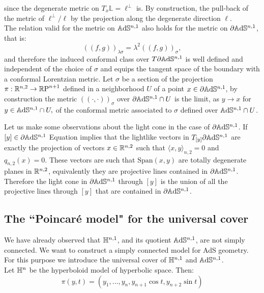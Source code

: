 since the degenerate metric on $T_x\mathbb{L}=\ell^\perp$ is. By construction, the pull-back of the metric of $\ell^{\perp}/\ell$ by the projection along the degenerate direction $\ell$.\\ 
The relation valid for the metric on $\mathbb{A}\mathrm{d}\mathbb{S}^{n,1}$ also holds for the metric on $\partial\mathbb{A}\mathrm{d}\mathbb{S}^{n,1}$, that is: 
\begin{equation}\label{26}
    ((f,g))_{\lambda\sigma}=\lambda^2((f,g))_{\sigma},
\end{equation} 
and therefore the induced conformal class over $T\partial\mathbb{A}\mathrm{d}\mathbb{S}^{n,1}$ is well defined and independent of the choice of $\sigma$ and equips the tangent space of the boundary with a conformal Lorentzian metric. %
Let $\sigma$ be a section of the projection $\pi:\mathbb{R}^{n,2}\to \mathbb{R}\text{P}^{n+1}$ defined in a neighborhood $U$ of a point $x\in\partial\mathbb{A}\mathrm{d}\mathbb{S}^{n,1}$, by construction the metric $((\cdot,\cdot))_\sigma$ over $\partial\mathbb{A}\mathrm{d}\mathbb{S}^{n,1}\cap U$ is the limit, as $y\to x$ for $y\in\mathbb{A}\mathrm{d}\mathbb{S}^{n,1}\cap U,$ of the conformal metric associated to $\sigma$ defined over $\mathbb{A}\mathrm{d}\mathbb{S}^{n,1}\cap U$. 
\begin{observation}\label{222}
Let us make some observations about the light cone in the case of $\partial\mathbb{A}\mathrm{d}\mathbb{S}^{n,1}$. If $[y]\in\partial\mathbb{A}\mathrm{d}\mathbb{S}^{n,1}$ Equation  implies that the lightlike vectors in $T_{[y]}\partial\mathbb{A}\mathrm{d}\mathbb{S}^{n,1}$ are exactly the projection of vectors $x\in \mathbb{R}^{n,2}$ such that $\langle x,y\rangle_{n,2}=0$ and $q_{n,2}(x)=0$. These vectors are such that $\text{Span}(x,y)$ are totally degenerate planes in $\mathbb{R}^{n,2}$, equivalently they are projective lines contained in $\partial\mathbb{A}\mathrm{d}\mathbb{S}^{n,1}$. Therefore the light cone in $\partial\mathbb{A}\mathrm{d}\mathbb{S}^{n,1}$ through $[y]$ is the union of all the projective lines through $[y]$ that are contained in $\partial\mathbb{A}\mathrm{d}\mathbb{S}^{n,1}$.

\end{observation}


\subsection{The ``Poincaré model" for the universal cover}
We have already observed that $\mathbb{H}^{n,1}$, and its quotient $\mathbb{A}\mathrm{d}\mathbb{S}^{n,1}$, are not simply connected. We want to construct a simply connected model for AdS geometry. For this purpose we introduce the universal cover of $\mathbb{H}^{n,1}$ and $\mathbb{A}\mathrm{d}\mathbb{S}^{n,1}$.\\
Let $\mathbb{H}^n$ be the hyperboloid model of hyperbolic space. Then: 
\begin{equation}\label{ogcover}
    \pi(y,t)=(y_1,\dots,y_n,y_{n+1}\cos t,y_{n+2}\sin t)
\end{equation}



